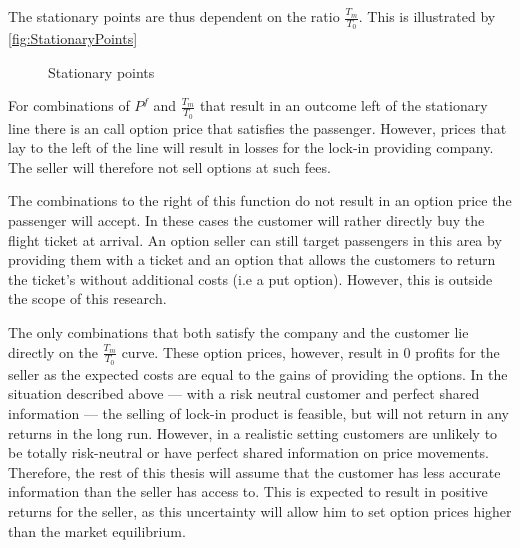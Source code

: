 The stationary points are thus dependent on the ratio $\frac{T_m}{T_0}$. This is illustrated by \autoref{fig:StationaryPoints}
\begin{figure*}
    \centering
    \caption{Stationary points}
    \label{fig:StationaryPoints}
\end{figure*}

For combinations of $P^f$ and $\frac{T_m}{T_0}$ that result in an outcome left of the stationary line there is an call option price that satisfies the passenger. However, prices that lay to the left of the line will result in losses for the lock-in providing company. The seller will therefore not sell options at such fees.

The combinations to the right of this function do not result in an option price the passenger will accept. In these cases the customer will rather directly buy the flight ticket at arrival. An option seller can still target passengers in this area by providing them with a ticket and an option that allows the customers to return the ticket's without additional costs (i.e a put option). However, this is outside the scope of this research.

The only combinations that both satisfy the company and the customer lie directly on the $\frac{T_m}{T_0}$ curve. These option prices, however, result in $0$ profits for the seller as the expected costs are equal to the gains of providing the options. In the situation described above --- with a risk neutral customer and perfect shared information --- the selling of lock-in product is feasible, but will not return in any returns in the long run. However, in a realistic setting customers are unlikely to be totally risk-neutral or have perfect shared information on price movements. Therefore, the rest of this thesis will assume that the customer has less accurate information than the seller has access to. This is expected to result in positive returns for the seller, as this uncertainty will allow him to set option prices higher than the market equilibrium.




